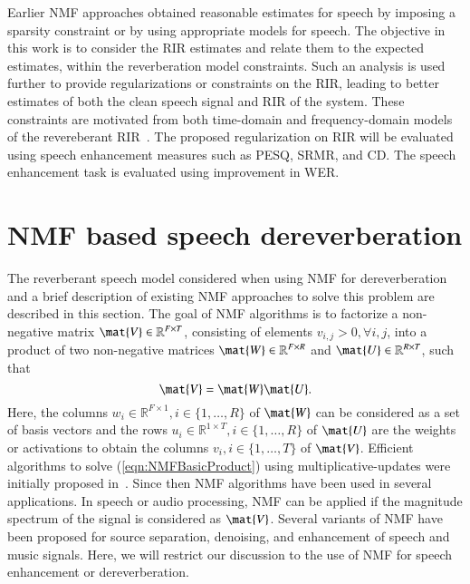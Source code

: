 Earlier NMF approaches obtained reasonable estimates for speech by imposing a
sparsity constraint or by using appropriate models for speech. The objective in
this work is to consider the RIR estimates and relate them to the expected
estimates, within the reverberation model constraints. Such an analysis is used
further to provide regularizations or constraints on the RIR, leading to better
estimates of both the clean speech signal and RIR of the system. These
constraints are motivated from both time-domain and frequency-domain models of
the revereberant RIR~\cite{naylor2010speech}. The proposed regularization on RIR
will be evaluated using speech enhancement measures such as PESQ, SRMR, and CD. The speech enhancement task is evaluated using improvement in WER.

\section{NMF based speech dereverberation}
The reverberant speech model considered when using NMF for dereverberation and a
brief description of existing NMF approaches to solve this problem are described
in this section. The goal of NMF algorithms is to factorize a non-negative
matrix $\mat{V} \in \mathbb{R}^{F \times T}$, consisting of elements $v_{i,j} >
0, \forall i,j$, into a product of two non-negative matrices $\mat{W} \in
\mathbb{R}^{F \times R}$ and
$\mat{U} \in \mathbb{R}^{R \times T}$, such that
\begin{equation}
\mat{V} = \mat{W} \mat{U}.
\label{eqn:NMFBasicProduct}
\end{equation}
Here, the columns $w_i\in \mathbb{R}^{F \times 1}, i \in \{1,\ldots, R\}$ of $\mat{W}$ can be considered as a set
of basis vectors and the rows $u_i\in\mathbb{R}^{1 \times T}, i \in \{1, \dots, R\}$ of $\mat{U}$ are the
weights or activations to obtain the columns $v_i, i \in \{1, \ldots, T\}$ of
$\mat{V}$. Efficient algorithms to solve (\ref{eqn:NMFBasicProduct}) using
multiplicative-updates were initially proposed in~\cite{lee99}. Since then NMF
algorithms have been used in several applications. In speech or audio
processing, NMF can be applied if the magnitude spectrum of the signal is
considered as $\mat{V}$. Several variants of NMF have been proposed for source
separation, denoising, and enhancement of speech and music signals. Here, we will restrict our discussion to the use of NMF for speech
enhancement or dereverberation.    

